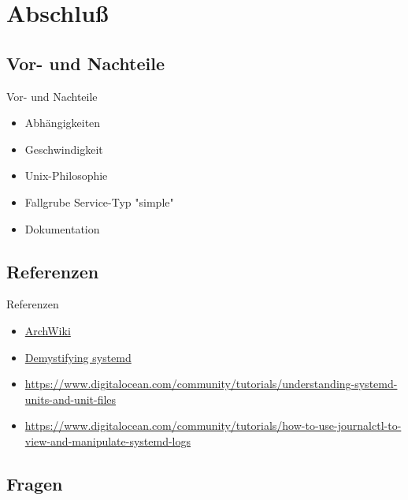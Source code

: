 \section{Abschluß}
\subsection{Vor- und Nachteile}

\begin{frame}{Vor- und Nachteile}
\begin{itemize}
\item[\goodsmile] Abhängigkeiten
\item[\goodsmile] Geschwindigkeit
\item[\neutralsmile] Unix-Philosophie	
\item[\sadsmile] Fallgrube Service-Typ "simple"
\item[\sadsmile] Dokumentation
\end{itemize}
\end{frame}

\subsection{Referenzen}

\begin{frame}{Referenzen}
\begin{itemize}	
	\item \href{https://wiki.archlinux.org/index.php/systemd}{ArchWiki}

	\item \href{https://www.redhat.com/files/summit/session-assets/2017/S103870-Demystifying-systemd.pdf}{Demystifying systemd}
	\item \href{https://www.digitalocean.com/community/tutorials/understanding-systemd-units-and-unit-files}{https://www.digitalocean.com/community/tutorials/understanding-systemd-units-and-unit-files}

	\item \href{https://www.digitalocean.com/community/tutorials/how-to-use-journalctl-to-view-and-manipulate-systemd-logs}{https://www.digitalocean.com/community/tutorials/how-to-use-journalctl-to-view-and-manipulate-systemd-logs}
\end{itemize}
\end{frame}

\subsection{Fragen}

